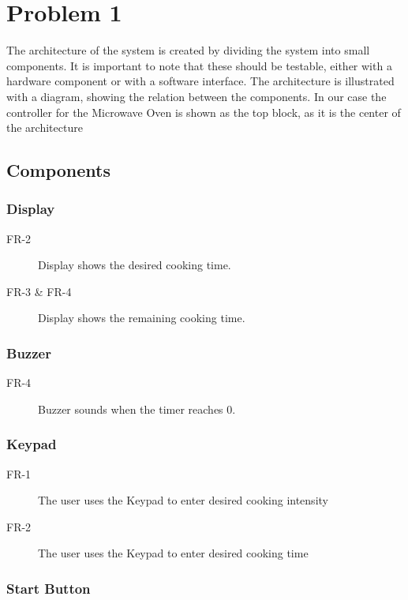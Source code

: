 \chapter{Problem 1}
The architecture of the system is created by dividing the system into small components. It is important to note that these should be testable, either with a hardware component or with a software interface.
The architecture is illustrated with a diagram, showing the relation between the components. In our case the controller for the Microwave Oven is shown as the top block, as it is the center of the architecture


\section{Components}
\subsection*{Display} 
\begin{description}
	\item[FR-2] Display shows the desired cooking time.
	\item[FR-3 \& FR-4] Display shows the remaining cooking time.
\end{description}

\subsection*{Buzzer}

\begin{description}
	\item[FR-4] Buzzer sounds when the timer reaches 0.
\end{description}

\subsection*{Keypad}

\begin{description}
	\item[FR-1] The user uses the Keypad to enter desired cooking intensity
	\item[FR-2] The user uses the Keypad to enter desired cooking time
\end{description}

\subsection*{Start Button}

